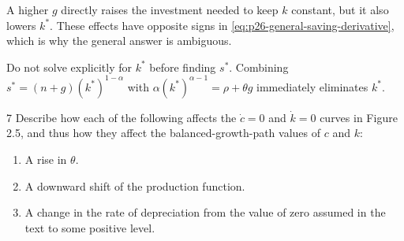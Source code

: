 \begin{note}
    A higher \(g\) directly raises the investment needed to keep \(k\)
    constant, but it also lowers \(k^*\). These effects have opposite signs
    in \eqref{eq:p26-general-saving-derivative}, which is why the general
    answer is ambiguous.
\end{note}

\begin{note}
    Do not solve explicitly for \(k^*\) before finding \(s^*\). Combining
    \(s^*=(n+g)(k^*)^{1-\alpha}\) with
    \(\alpha(k^*)^{\alpha-1}=\rho+\theta g\) immediately eliminates
    \(k^*\).
\end{note}

\begin{problem}{7}
Describe how each of the following affects the \(\dot{c}=0\) and \(\dot{k}=0\) curves in Figure 2.5, and thus how they affect the balanced-growth-path values of \(c\) and \(k\):
\begin{enumerate}[label=(\alph*)]
    \item A rise in \(\theta\).
    \item A downward shift of the production function.
    \item A change in the rate of depreciation from the value of zero assumed in the text to some positive level.
\end{enumerate}
\end{problem}

